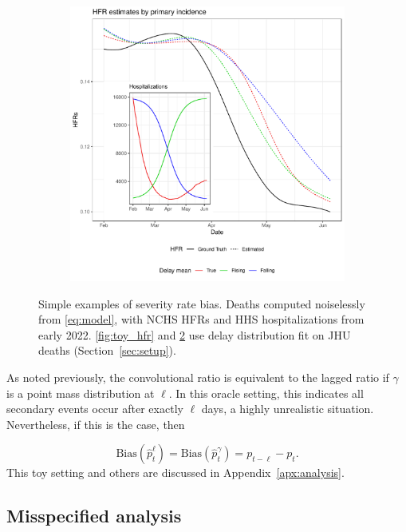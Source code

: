 \documentclass{article}
\begin{document}
\begin{figure}
\begin{subfigure}[b]{0.32\linewidth}
         \caption{}
         \label{fig:toy_delay}
     \end{subfigure}
     \begin{subfigure}[b]{0.32\linewidth}
         \centering
         \includegraphics[width=\linewidth]{Figs/Simulated/toy_chging_primary.pdf}
         \caption{}
         \label{fig:toy_primary}
     \end{subfigure}
        \caption{Simple examples of severity rate bias. Deaths computed noiselessly from \eqref{eq:model}, with NCHS HFRs and HHS hospitalizations from early 2022. \ref{fig:toy_hfr} and \ref{fig:toy_primary} use delay distribution fit on JHU deaths (Section~\ref{sec:setup}).}
        \label{fig:bias_ex_main}
\end{figure}


As noted previously, the convolutional ratio is equivalent to the lagged ratio if $\gamma$ is a point mass distribution at $\ell$. In this oracle setting, this indicates all secondary events occur after exactly $\ell$ days, a highly unrealistic situation. Nevertheless, if this is the case, then 

$$\text{Bias}(\hat{p}_t^\ell) = \text{Bias}(\hat{p}_t^\gamma) = p_{t-\ell}-p_t.$$
\noindent This toy setting and others are discussed in Appendix~\ref{apx:analysis}.

\subsection{Misspecified analysis}\label{sec:misp}
\end{document}
